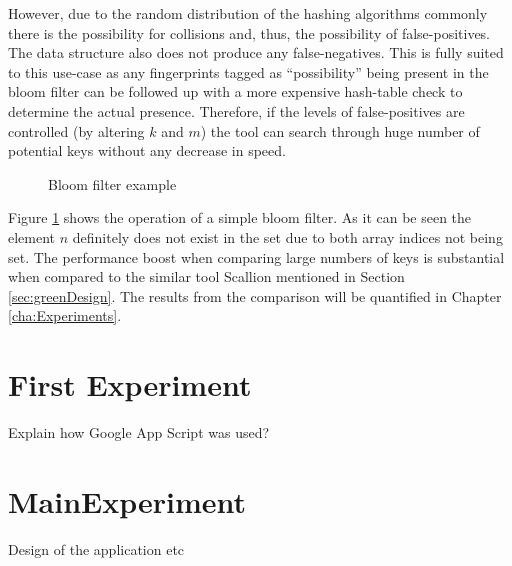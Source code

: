 However, due to the random distribution of the hashing algorithms commonly there is the possibility for collisions and, thus, the possibility of false-positives. The data structure also does not produce any false-negatives. This is fully suited to this use-case as any fingerprints tagged as ``possibility'' being present in the bloom filter can be followed up with a more expensive hash-table check to determine the actual presence. Therefore, if the levels of false-positives are controlled (by altering $k$ and $m$) the tool can search through huge number of potential keys without any decrease in speed.

\begin{figure}[h!]
    \centering
    
    \caption{Bloom filter example}
    \label{fig:bloom}
\end{figure}

Figure \ref{fig:bloom} shows the operation of a simple bloom filter. As it can be seen the element $n$ definitely does not exist in the set due to both array indices not being set. The performance boost when comparing large numbers of keys is substantial when compared to the similar tool Scallion mentioned in Section \ref{sec:greenDesign}. The results from the comparison will be quantified in Chapter \ref{cha:Experiments}.

\section{First Experiment}
Explain how Google App Script was used?

\section{MainExperiment}
Design of the application etc

